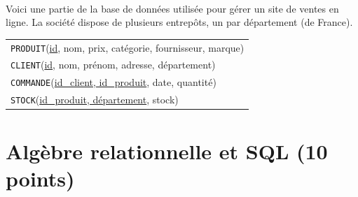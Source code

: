 
~\\Voici une partie de la base de donn\'ees utilis\'ee pour g\'erer un site de ventes en ligne. La soci\'et\'e dispose de plusieurs entrep\^ots, un par d\'epartement (de France).

\begin{tabular}{l}
\texttt{PRODUIT}(\underline{id}, nom, prix, cat\'egorie, fournisseur, marque)\\
\texttt{CLIENT}(\underline{id}, nom, pr\'enom, adresse, d\'epartement)\\
\texttt{COMMANDE}(\underline{id\_client, id\_produit}, date, quantit\'e)\\
\texttt{STOCK}(\underline{id\_produit, d\'epartement}, stock)\\
\end{tabular}


\section{Alg\`ebre relationnelle et SQL (10 points)}

